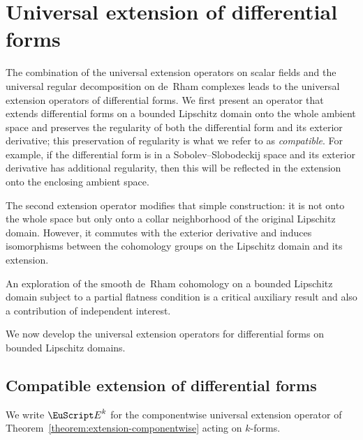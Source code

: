 \documentclass[10pt,a4paper]{amsart}
\theoremstyle{definition}
\theoremstyle{remark}
\numberwithin{equation}{section}
\newcommand{\euE}{{\EuScript E}}
\newcommand{\Extension}{\euE}
\begin{document}
\section{Universal extension of differential forms}\label{section:extension-of-forms}

The combination of the universal extension operators on scalar fields and the universal regular decomposition on de~Rham complexes leads to the universal extension operators of differential forms.
We first present an operator that extends differential forms on a bounded Lipschitz domain onto the whole ambient space and preserves the regularity of both the differential form and its exterior derivative; this preservation of regularity is what we refer to as \emph{compatible}.
For example, if the differential form is in a Sobolev--Slobodeckij space and its exterior derivative has additional regularity, then this will be reflected in the extension onto the enclosing ambient space.

The second extension operator modifies that simple construction: 
it is not onto the whole space but only onto a collar neighborhood of the original Lipschitz domain. 
However, it commutes with the exterior derivative and induces isomorphisms
between the cohomology groups on the Lipschitz domain and its extension.

An exploration of the smooth de~Rham cohomology on a bounded Lipschitz domain subject to a partial flatness condition 
is a critical auxiliary result and also a contribution of independent interest.

We now develop the universal extension operators for differential forms on bounded Lipschitz domains. 

\subsection{Compatible extension of differential forms}

We write $\Extension^{k}$ for the componentwise universal extension operator of Theorem~\ref{theorem:extension-componentwise} acting on $k$-forms.
\end{document}
